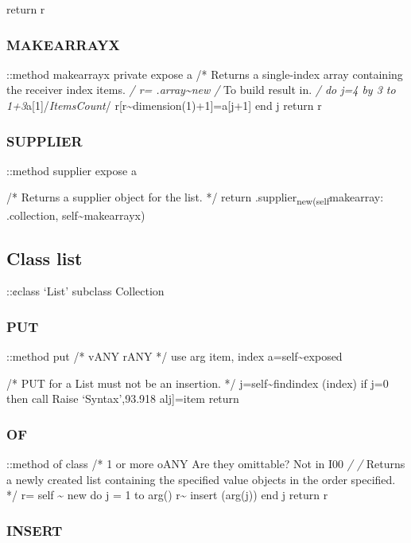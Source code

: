 return r

\subsubsection{MAKEARRAYX}\label{makearrayx}

::method makearrayx private expose a /* Returns a single-index array
containing the receiver index items. \emph{/ r=
.array\textasciitilde new /} To build result in. \emph{/ do j=4 by 3 to
1+3}a{[}1{]}/\emph{ItemsCount}/
r{[}r\textasciitilde dimension(1)+1{]}=a{[}j+1{]} end j return r

\subsubsection{SUPPLIER}\label{supplier}

::method supplier expose a

/* Returns a supplier object for the list. */ return
.supplier\textsubscript{new(self}makearray: .collection,
self\textasciitilde makearrayx)

\subsection{Class list}\label{class-list}

::¢class `List' subclass Collection

\subsubsection{PUT}\label{put-1}

::method put /* vANY rANY */ use arg item, index
a=self\textasciitilde exposed

/* PUT for a List must not be an insertion. */
j=self\textasciitilde findindex (index) if j=0 then call Raise
`Syntax',93.918 alj{]}=item return

\subsubsection{OF}\label{of}

::method of class /* 1 or more oANY Are they omittable? Not in I00
\emph{/ /} Returns a newly created list containing the specified value
objects in the order specified. */ r= self \textasciitilde{} new do j =
1 to arg() r\textasciitilde{} insert (arg(j)) end j return r

\subsubsection{INSERT}\label{insert}

